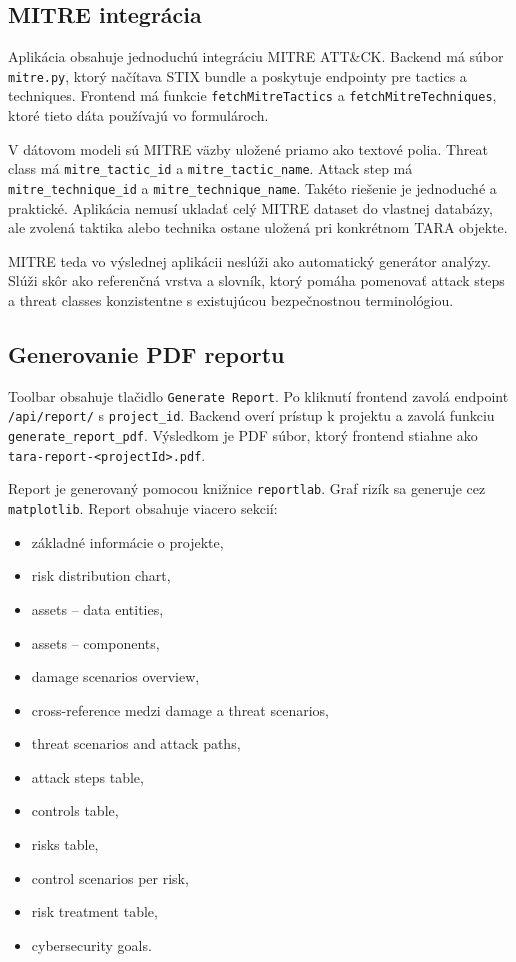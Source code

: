 \documentclass[11pt]{article}
\begin{document}
\subsection{MITRE integrácia}

Aplikácia obsahuje jednoduchú integráciu MITRE ATT\&CK. Backend má súbor \texttt{mitre.py}, ktorý načítava STIX bundle a poskytuje endpointy pre tactics a techniques. Frontend má funkcie \texttt{fetchMitreTactics} a \texttt{fetchMitreTechniques}, ktoré tieto dáta používajú vo formulároch.

V dátovom modeli sú MITRE väzby uložené priamo ako textové polia. Threat class má \texttt{mitre\_tactic\_id} a \texttt{mitre\_tactic\_name}. Attack step má \texttt{mitre\_technique\_id} a \texttt{mitre\_technique\_name}. Takéto riešenie je jednoduché a praktické. Aplikácia nemusí ukladať celý MITRE dataset do vlastnej databázy, ale zvolená taktika alebo technika ostane uložená pri konkrétnom TARA objekte.

MITRE teda vo výslednej aplikácii neslúži ako automatický generátor analýzy. Slúži skôr ako referenčná vrstva a slovník, ktorý pomáha pomenovať attack steps a threat classes konzistentne s existujúcou bezpečnostnou terminológiou.

\subsection{Generovanie PDF reportu}

Toolbar obsahuje tlačidlo \texttt{Generate Report}. Po kliknutí frontend zavolá endpoint \texttt{/api/report/} s \texttt{project\_id}. Backend overí prístup k projektu a zavolá funkciu \texttt{generate\_report\_pdf}. Výsledkom je PDF súbor, ktorý frontend stiahne ako \texttt{tara-report-<projectId>.pdf}.

Report je generovaný pomocou knižnice \texttt{reportlab}. Graf rizík sa generuje cez \texttt{matplotlib}. Report obsahuje viacero sekcií:

\begin{itemize}
    \item základné informácie o projekte,
    \item risk distribution chart,
    \item assets -- data entities,
    \item assets -- components,
    \item damage scenarios overview,
    \item cross-reference medzi damage a threat scenarios,
    \item threat scenarios and attack paths,
    \item attack steps table,
    \item controls table,
    \item risks table,
    \item control scenarios per risk,
    \item risk treatment table,
    \item cybersecurity goals.
\end{itemize}
\end{document}
